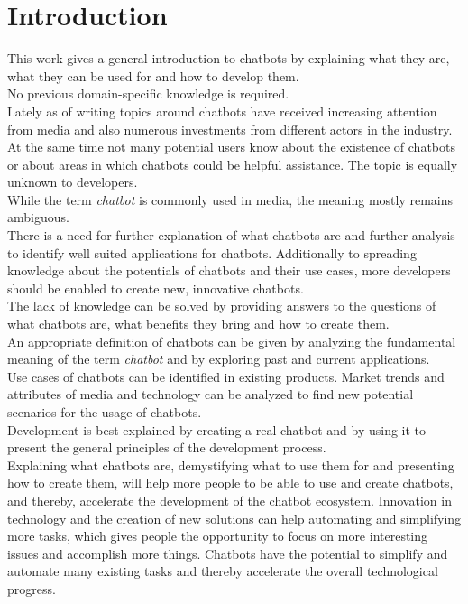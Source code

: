 \chapter{Introduction}

\pagestyle{useheadings} %


This work gives a general introduction to chatbots
by explaining what they are, what they can be used for and how to develop them.
\\
No previous domain-specific knowledge is required.
\\

Lately as of writing topics around chatbots have received increasing attention from media and also numerous investments from different actors in the industry.
At the same time not many potential users know about the existence of chatbots or about areas in which chatbots could be helpful assistance.
The topic is equally unknown to developers.
\\
While the term \emph{chatbot} is commonly used in media, the meaning mostly remains ambiguous.
\\
There is a need for further explanation of what chatbots are and further analysis to identify well suited applications for chatbots.
Additionally to spreading knowledge about the potentials of chatbots and their use cases,
more developers should be enabled to create new, innovative chatbots.
\\

The lack of knowledge can be solved by providing answers to the questions of what chatbots are, what benefits they bring and how to create them.
\\
An appropriate definition of chatbots can be given by analyzing the fundamental meaning of the term \emph{chatbot} and by exploring past and current applications.
\\
Use cases of chatbots can be identified in existing products. Market trends and attributes of media and technology can be analyzed to find new potential scenarios for the usage of chatbots.
\\
Development is best explained by creating a real chatbot and by using it to present the general principles of the development process.
\\

Explaining what chatbots are, demystifying what to use them for and presenting how to create them,
will help more people to be able to use and create chatbots, and thereby, accelerate the development of the chatbot ecosystem.
Innovation in technology and the creation of new solutions can help automating and simplifying more tasks,
which gives people the opportunity to focus on more interesting issues and accomplish more things.
Chatbots have the potential to simplify and automate many existing tasks and thereby accelerate the overall technological progress.
\\

